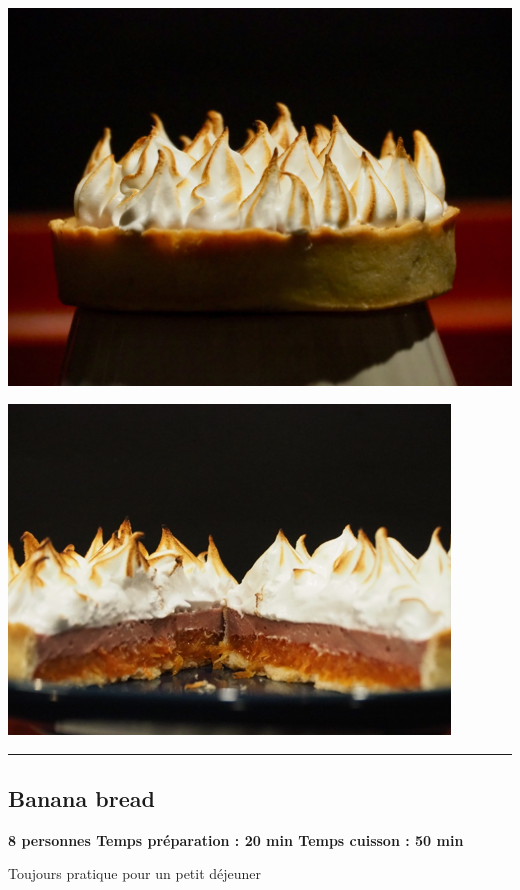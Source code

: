 \documentclass[]{book}
\begin{document}
\begin{center}\includegraphics[width=0.9\linewidth]{photos/pamp1} \end{center}

\begin{center}\includegraphics[width=0.9\linewidth]{photos/pamp2} \end{center}

\begin{center}\rule{0.5\linewidth}{0.5pt}\end{center}

\subsection*{\texorpdfstring{{Banana
bread}}{Banana bread}}\label{banana-bread}

\begin{sucrebox}
\textbf{8 personnes \textbar{} Temps préparation : 20 min \textbar{}
Temps cuisson : 50 min}

Toujours pratique pour un petit déjeuner
\end{sucrebox}
\end{document}

